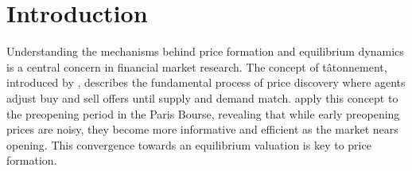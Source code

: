 \documentclass[webpdf,modern,medium]{oup-authoring-template}
\theoremstyle{thmstyleone}%
\theoremstyle{thmstyletwo}%
\theoremstyle{thmstylethree}%
\begin{document}





\maketitle



\linenumbers
\onehalfspacing
\section{Introduction}






Understanding the mechanisms behind price formation and equilibrium dynamics is a central concern in financial market research. The concept of t\^{a}tonnement, introduced by \citet{walras1889}, describes the fundamental process of price discovery where agents adjust buy and sell offers until supply and demand match. \citet{biais1999} apply this concept to the preopening period in the Paris Bourse, revealing that while early preopening prices are noisy, they become more informative and efficient as the market nears opening. This convergence towards an equilibrium valuation is key to price formation.
\end{document}
